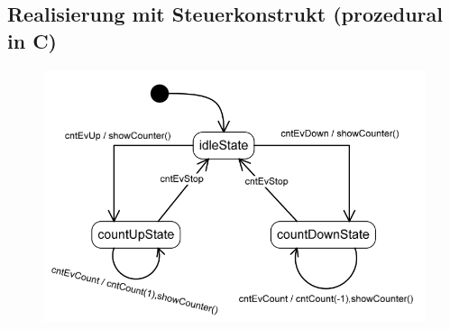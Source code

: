 \subsection{Realisierung mit Steuerkonstrukt (prozedural in C)}
\begin{figure}[h]
      \centering
      \includegraphics[scale = 0.35]{images/FSM/Up_down_counter}
\end{figure}
